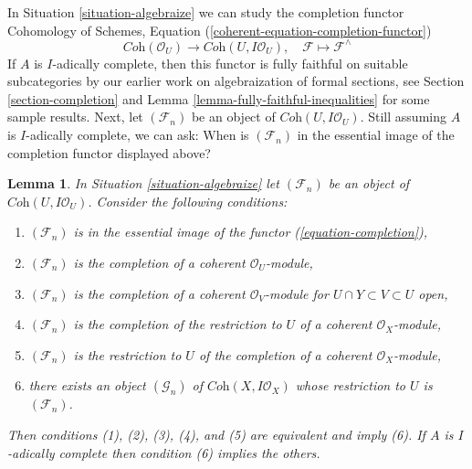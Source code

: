 \documentclass{stacks-project}
\theoremstyle{plain}
\newtheorem{lemma}[subsection]{Lemma}
\theoremstyle{definition}
\theoremstyle{remark}
\numberwithin{equation}{subsection}
\begin{document}
\noindent
In Situation \ref{situation-algebraize} we can study the completion functor
Cohomology of Schemes, Equation (\ref{coherent-equation-completion-functor})
\begin{equation}
\label{equation-completion}
\textit{Coh}(\mathcal{O}_U)
\longrightarrow
\textit{Coh}(U, I\mathcal{O}_U),\quad
\mathcal{F} \longmapsto \mathcal{F}^\wedge
\end{equation}
If $A$ is $I$-adically complete, then this functor is fully faithful
on suitable subcategories by our earlier work on algebraization of
formal sections, see Section \ref{section-completion} and
Lemma \ref{lemma-fully-faithful-inequalities} for some sample results.
Next, let $(\mathcal{F}_n)$ be an object of $\textit{Coh}(U, I\mathcal{O}_U)$.
Still assuming $A$ is $I$-adically complete, we can ask:
When is $(\mathcal{F}_n)$ in the essential image of the completion
functor displayed above?

\begin{lemma}
\label{lemma-essential-image-completion}
In Situation \ref{situation-algebraize} let $(\mathcal{F}_n)$
be an object of $\textit{Coh}(U, I\mathcal{O}_U)$. Consider the
following conditions:
\begin{enumerate}
\item $(\mathcal{F}_n)$ is in the essential image
of the functor (\ref{equation-completion}),
\item $(\mathcal{F}_n)$ is the completion of a
coherent $\mathcal{O}_U$-module,
\item $(\mathcal{F}_n)$ is the completion of a coherent
$\mathcal{O}_V$-module for $U \cap Y \subset V \subset U$ open,
\item $(\mathcal{F}_n)$ is the completion of
the restriction to $U$ of a coherent $\mathcal{O}_X$-module,
\item $(\mathcal{F}_n)$ is the restriction to $U$ of
the completion of a coherent $\mathcal{O}_X$-module,
\item there exists an object $(\mathcal{G}_n)$ of
$\textit{Coh}(X, I\mathcal{O}_X)$ whose restriction
to $U$ is $(\mathcal{F}_n)$.
\end{enumerate}
Then conditions (1), (2), (3), (4), and (5) are equivalent and imply (6).
If $A$ is $I$-adically complete then condition (6) implies the others.
\end{lemma}
\end{document}
